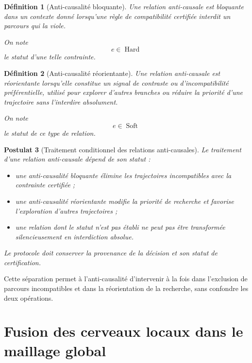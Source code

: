 \documentclass[11pt,a4paper,oneside]{book}
\newtheorem{definition}{Définition}[chapter]
\newtheorem{postulat}[definition]{Postulat}
\theoremstyle{remark}
\DeclareMathOperator{\Hard}{Hard}
\DeclareMathOperator{\Soft}{Soft}
\begin{document}
\begin{definition}[Anti-causalité bloquante]
Une relation anti-causale est bloquante dans un contexte donné
lorsqu'une règle de compatibilité certifiée interdit un parcours
qui la viole.

On note
\[
e\in\Hard
\]
le statut d'une telle contrainte.
\end{definition}

\begin{definition}[Anti-causalité réorientante]
Une relation anti-causale est réorientante lorsqu'elle constitue
un signal de contraste ou d'incompatibilité préférentielle, utilisé
pour explorer d'autres branches ou réduire la priorité d'une
trajectoire sans l'interdire absolument.

On note
\[
e\in\Soft
\]
le statut de ce type de relation.
\end{definition}

\begin{postulat}[Traitement conditionnel des relations anti-causales]
Le traitement d'une relation anti-causale dépend de son statut :

\begin{itemize}
  \item une anti-causalité bloquante élimine les trajectoires
        incompatibles avec la contrainte certifiée ;
  \item une anti-causalité réorientante modifie la priorité de
        recherche et favorise l'exploration d'autres trajectoires ;
  \item une relation dont le statut n'est pas établi ne peut pas
        être transformée silencieusement en interdiction absolue.
\end{itemize}

Le protocole doit conserver la provenance de la décision et son
statut de certification.
\end{postulat}

Cette séparation permet à l'anti-causalité d'intervenir à la fois
dans l'exclusion de parcours incompatibles et dans la réorientation
de la recherche, sans confondre les deux opérations.


\chapter{Fusion des cerveaux locaux dans le maillage global}
\end{document}
